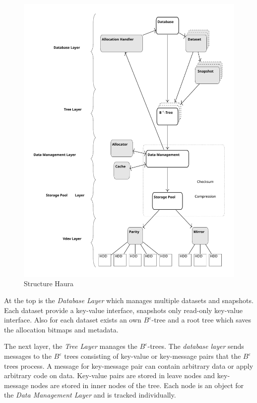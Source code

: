 \documentclass[
	12pt,
	a4paper,
	abstract,
	bibliography=totoc,
	chapterprefix,
	headings=openright,
	numbers=endperiod,
	parskip=half,
	twoside,
]{scrreprt}
\begin{document}
\begin{figure}[ht]
	\centering
	\includegraphics[scale=0.4]{overview_haura_level.pdf}
	\caption{Structure Haura \cite{wiedemann2018modern}}
		\label{fig:structure Haura}
\end{figure}



At the top is the \emph{Database Layer} which manages multiple datasets and snapshots. Each dataset provide a key-value interface, snapshots only read-only key-value interface. Also for each dataset exists an own $B^{\varepsilon}$-tree and  a root tree which saves the allocation bitmaps and metadata.

The next layer, the \emph{Tree Layer} manages the $B^{\varepsilon}$-trees.
The \emph{database layer} sends messages to the $B^{\varepsilon}$ trees consisting of key-value or key-message pairs that the $B^{\varepsilon}$ trees process. A message for key-message pair can contain arbitrary data or apply arbitrary code on data.
Key-value pairs are stored in leave nodes and key-message nodes are stored in inner nodes of the tree.
Each node is an object for the \emph{Data Management Layer} and is tracked individually.
\end{document}
